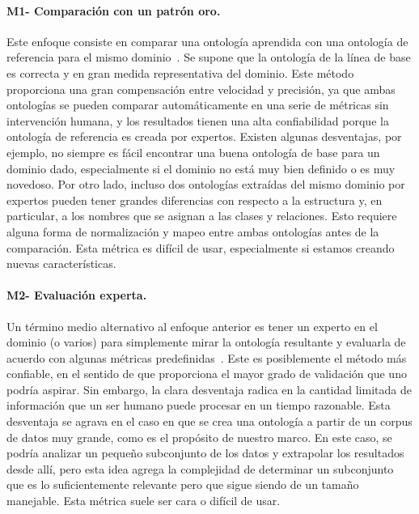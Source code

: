     \paragraph{M1- Comparación con un patrón oro.}
    Este enfoque consiste en comparar una ontología aprendida con una ontología de referencia para el mismo dominio~\cite{corcoglioniti2016frame}.
    Se supone que la ontología de la línea de base es correcta y en gran medida representativa del dominio.
    Este método proporciona una gran compensación entre velocidad y precisión, ya que ambas ontologías se pueden comparar automáticamente en una serie de métricas sin intervención humana, y los resultados tienen una alta confiabilidad porque la ontología de referencia es creada por expertos.
    Existen algunas desventajas, por ejemplo, no siempre es fácil encontrar una buena ontología de base para un dominio dado, especialmente si el dominio no está muy bien definido o es muy novedoso.
    Por otro lado, incluso dos ontologías extraídas del mismo dominio por expertos pueden tener grandes diferencias con respecto a la estructura y, en particular, a los nombres que se asignan a las clases y relaciones.
    Esto requiere alguna forma de normalización y mapeo entre ambas ontologías antes de la comparación.
    Esta métrica es difícil de usar, especialmente si estamos creando nuevas características. 

    \paragraph{M2- Evaluación experta.}
    Un término medio alternativo al enfoque anterior es tener un experto en el dominio (o varios) para simplemente mirar la ontología resultante y evaluarla de acuerdo con algunas métricas predefinidas~\cite{ROSPOCHER2016132}.
    Este es posiblemente el método más confiable, en el sentido de que proporciona el mayor grado de validación que uno podría aspirar.
    Sin embargo, la clara desventaja radica en la cantidad limitada de información que un ser humano puede procesar en un tiempo razonable.
    Esta desventaja se agrava en el caso en que se crea una ontología a partir de un corpus de datos muy grande, como es el propósito de nuestro marco.
    En este caso, se podría analizar un pequeño subconjunto de los datos y extrapolar los resultados desde allí, pero esta idea agrega la complejidad de determinar un subconjunto que es lo suficientemente relevante pero que sigue siendo de un tamaño manejable.
    Esta métrica suele ser cara o difícil de usar.


